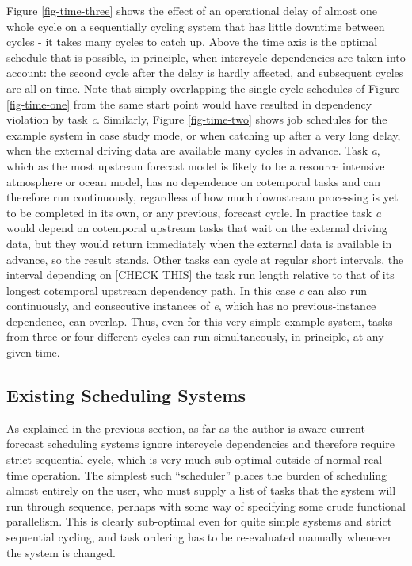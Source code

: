 \documentclass[11pt,a4paper]{article}
\begin{document}
Figure \ref{fig-time-three} shows the effect of an operational delay of
almost one whole cycle on a sequentially cycling system that has little
downtime between cycles - it takes many cycles to catch up. Above the
time axis is the optimal schedule that is possible, in principle, when
intercycle dependencies are taken into account: the second cycle after
the delay is hardly affected, and subsequent cycles are all on time.
Note that simply overlapping the single cycle schedules of Figure
\ref{fig-time-one} from the same start point would have resulted in
dependency violation by task {\em c}. Similarly, Figure
\ref{fig-time-two} shows job schedules for the example system in case
study mode, or when catching up after a very long delay, when the
external driving data are available many cycles in advance.  Task {\em
a}, which as the most upstream forecast model is likely to be a resource
intensive atmosphere or ocean model, has no dependence on cotemporal
tasks and can therefore run continuously, regardless of how much
downstream processing is yet to be completed in its own, or any
previous, forecast cycle. In practice task {\em a} would depend on
cotemporal upstream tasks that wait on the external driving data, but
they would return immediately when the external data is available in
advance, so the result stands. Other tasks can cycle at regular short
intervals, the interval depending on [CHECK THIS] the task run length
relative to that of its longest cotemporal upstream dependency path. In
this case {\em c} can also run continuously, and consecutive instances
of {\em e}, which has no previous-instance dependence, can overlap.
Thus, even for this very simple example system, tasks from three or four
different cycles can run simultaneously, in principle, at any given
time. 


\subsection{Existing Scheduling Systems}

As explained in the previous section, as far as the author is aware
current forecast scheduling systems ignore intercycle dependencies and
therefore require strict sequential cycle, which is very much
sub-optimal outside of normal real time operation. The simplest such
``scheduler'' places the burden of scheduling almost entirely on the
user, who must supply a list of tasks that the system will run through
sequence, perhaps with some way of specifying some crude functional
parallelism. This is clearly sub-optimal even for quite simple systems
and strict sequential cycling, and task ordering has to be re-evaluated
manually whenever the system is changed. 
\end{document}
